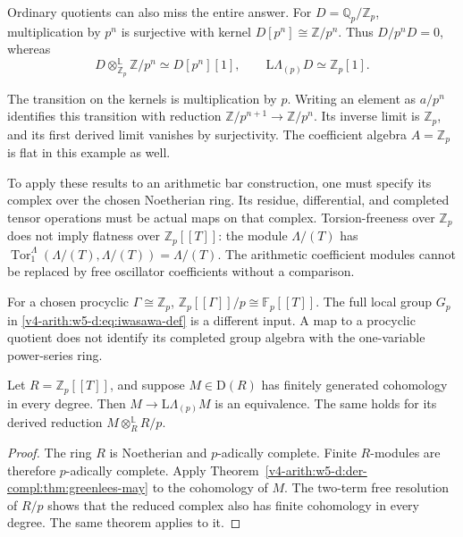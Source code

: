 Ordinary quotients can also miss the entire answer.
For \(D=\mathbb Q_p/\mathbb Z_p\), multiplication by \(p^n\)
is surjective with kernel \(D[p^n]\cong\mathbb Z/p^n\).
Thus \(D/p^nD=0\), whereas
\[
 D\otimes_{\mathbb Z_p}^{\mathbb L}\mathbb Z/p^n
   \simeq D[p^n][1],
 \qquad
 \mathrm L\Lambda_{(p)}D\simeq\mathbb Z_p[1].
\]

The transition on the kernels is multiplication by \(p\).
Writing an element as \(a/p^n\) identifies this transition
with reduction \(\mathbb Z/p^{n+1}\to\mathbb Z/p^n\).
Its inverse limit is \(\mathbb Z_p\), and its first derived
limit vanishes by surjectivity.
The coefficient algebra \(A=\mathbb Z_p\) is flat in this
example as well.

\begin{remark}
\label{v4-arith:w5-d:der-compl:rem:verify-hypothesis}
To apply these results to an arithmetic bar construction,
one must specify its complex over the chosen Noetherian ring.
Its residue, differential, and completed tensor operations must
be actual maps on that complex.
Torsion-freeness over \(\mathbb Z_p\) does not imply flatness
over \(\mathbb Z_p[[T]]\): the module \(\Lambda/(T)\) has
\(\operatorname{Tor}_1^\Lambda(\Lambda/(T),\Lambda/(T))
=\Lambda/(T)\).
The arithmetic coefficient modules cannot be replaced by free
oscillator coefficients without a comparison.

For a chosen procyclic \(\Gamma\cong\mathbb Z_p\),
\(\mathbb Z_p[[\Gamma]]/p\cong\mathbb F_p[[T]]\).
The full local group \(G_p\) in
\eqref{v4-arith:w5-d:eq:iwasawa-def} is a different input.
A map to a procyclic quotient does not identify its completed
group algebra with the one-variable power-series ring.
\end{remark}

\begin{corollary}
\label{v4-arith:w5-d:der-compl:cor:subitem-2}
Let \(R=\mathbb Z_p[[T]]\), and suppose
\(M\in\mathrm D(R)\) has finitely generated cohomology in
every degree. Then \(M\to\mathrm L\Lambda_{(p)}M\) is an
equivalence. The same holds for its derived reduction
\(M\otimes_R^{\mathbb L}R/p\).
\end{corollary}
\begin{proof}
The ring \(R\) is Noetherian and \(p\)-adically complete.
Finite \(R\)-modules are therefore \(p\)-adically complete.
Apply Theorem~\ref{v4-arith:w5-d:der-compl:thm:greenlees-may}
to the cohomology of \(M\).
The two-term free resolution of \(R/p\) shows that the
reduced complex also has finite cohomology in every degree.
The same theorem applies to it.
\end{proof}

